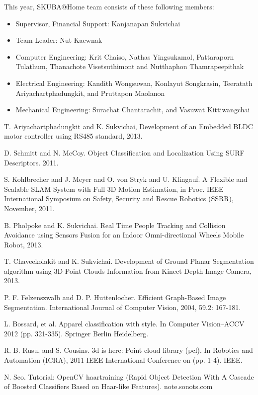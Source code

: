 \documentclass{llncs}
\begin{document}
This year, SKUBA@Home team consists of these following members:
\begin{itemize}
\item Supervisor, Financial Support: Kanjanapan Sukvichai
\item Team Leader: Nut Kaewnak
\item Computer Engineering: Krit Chaiso, Nathas Yingsukamol, Pattaraporn Tulathum, Thanachote Visetsuthimont and Nutthaphon Thamrapeepithak 
\item Electrical Engineering:  Kandith Wongsuwan, Konlayut Songkrasin, Teeratath Ariyachartphadungkit, and Pruttapon Maolanon
\item Mechanical Engineering: Surachat Chantarachit, and Vasuwat Kittiwangchai
\end{itemize}
\begin{thebibliography}{4}

 T. Ariyachartphadungkit and K. Sukvichai, Development of an Embedded BLDC motor controller using RS485 standard, 2013.

 D. Schmitt and N. McCoy. Object Classification and Localization Using SURF Descriptors. 2011.

 S. Kohlbrecher and J. Meyer and O. von Stryk and U. Klingauf. A Flexible and Scalable SLAM System with Full 3D Motion Estimation, in Proc. IEEE International Symposium on Safety, Security and Rescue Robotics (SSRR), November, 2011.

 B. Pholpoke and K. Sukvichai. Real Time People Tracking and Collision Avoidance using Sensors Fusion for an Indoor Omni-directional Wheels Mobile Robot, 2013.

 T. Chaveekolakit and K. Sukvichai. Development of Ground Planar Segmentation algorithm using 3D Point Clouds Information from Kinect Depth Image Camera, 2013.

 P. F. Felzenszwalb and D. P. Huttenlocher. Efficient Graph-Based Image Segmentation. International Journal of Computer Vision, 2004, 59.2: 167-181.

 L. Bossard, et al. Apparel classification with style. In Computer Vision–ACCV 2012 (pp. 321-335). Springer Berlin Heidelberg.

 R. B. Rusu,  and S. Cousins. 3d is here: Point cloud library (pcl). In Robotics and Automation (ICRA), 2011 IEEE International Conference on (pp. 1-4). IEEE.

 N. Seo. Tutorial: OpenCV haartraining (Rapid Object Detection With A Cascade of Boosted Classifiers Based on Haar-like Features). note.sonots.com

\end{thebibliography}
\end{document}
